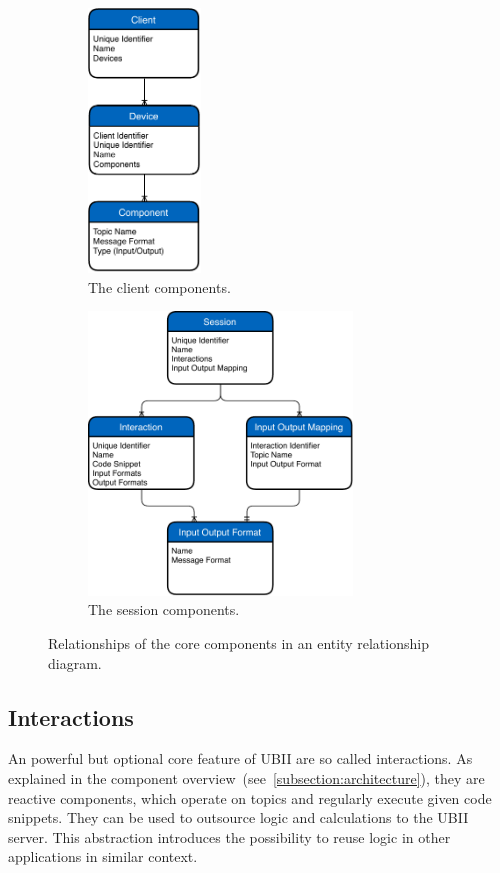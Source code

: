 \begin{figure}[htpb]
  \centering
  \begin{subfigure}{.5\textwidth}
    \centering
    \includegraphics[width=3cm]{figures/ubii_er_client.pdf}
    \caption{The client components.}
    \label{fig:ubii_er_client}
  \end{subfigure}%
  \begin{subfigure}{.5\textwidth}
    \centering
    \includegraphics[width=7cm]{figures/ubii_er_server.pdf}
    \caption{The session components.}
    \label{fig:ubii_er_server}
  \end{subfigure}
  \caption[UBII Components Diagram]{Relationships of the core components in an entity relationship diagram.}
  \label{fig:ubii_er}
\end{figure}


\subsection{Interactions}\label{subsection:interactions}
An powerful but optional core feature of \ac{UBII} are so called interactions. As explained in the component overview~(see~\ref{subsection:architecture}), they are reactive components, which operate on topics and regularly execute given code snippets. They can be used to outsource logic and calculations to the \ac{UBII} server. This abstraction introduces the possibility to reuse logic in other applications in similar context. 

